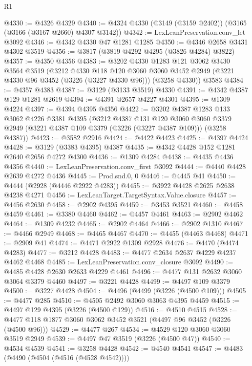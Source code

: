\begin{lexlean}{R1}
\begin{coremodule}
@4330 := @4326 @4329
@4340 := @4324 @4330 (@3149 (@3159 @2402)) (@3165 (@3166 (@3167 @2660) @4307 @3142))
@4342 := LexLeanPreservation.conv_let @3092
@4346 := @4342 @4330 @47 @1281 @1285
@4350 := @4346 @2658 @3431 @4302 @3519
@4356 := @3817 (@3819 @4292 @4295 (@3826 @4284) @3822)
@4357 := @4350 @4356
@4383 := @3202
    @4330
    @1283
    @121
    @3062
    @3430
    @3564
    @3519
    (@3212
      @4330
      @118
      @120
      @3060
      @3060
      @3452
      @2949
      (@3221 @4330 @96 @3452 (@3226 (@3227 @4330 @96)))
      (@3258 @4330))
    @3583
@4384 := @4357 @4383
@4387 := @3129 (@3133 @3519) @4330
@4391 := @4342 @4387 @129 @1281 @2619
@4394 := @4391 @2657 @4227 @4301
@4395 := @1309 @4224
@4397 := @4394 @4395 @4356
@4422 := @3202
    @4387
    @1283
    @133
    @3062
    @4226
    @3381
    @4395
    (@3212
      @4387
      @131
      @120
      @3060
      @3060
      @3379
      @2949
      (@3221 @4387 @109 @3379 (@3226 (@3227 @4387 @109)))
      (@3258 @4387))
@4423 := @3582 @2916
@4424 := @4422 @4423
@4425 := @4397 @4424
@4428 := @3129 (@3383 @4395) @4387
@4435 := @4342 @4428 @152 @1281 @2640 @2656 @4272 @4300
@4436 := @1309 @4284
@4438 := @4435 @4436 @4356
@4440 := LexLeanPreservation.conv_first @3092
@4444 := @4440 @4428 @2639 @4272 @4436
@4445 := Prod.snd.{0, 0}
@4446 := @4445 @41
@4450 := @4444 (@2928 (@4446 @2922 @4283))
@4455 := @3922 @4428 @2625 @2638 @4238 @4271
@4456 := LexLeanTarget.TargetSyntax.Value.closure
@4457 := @4456 @2630
@4458 := @2902 @4395
@4459 := @3453 @3521
@4460 := @4458 @4459
@4461 := @3380 @4460
@4462 := @4457 @4461
@4463 := @2902 @4462
@4464 := @1309 @4232
@4465 := @2902 @4464
@4466 := @2902 @1310
@4467 := @4466 @2949
@4468 := @4465 @4467
@4470 := @4455 (@4463 @4468)
@4471 := @2909 @41
@4474 := @4471 @2922 @1309 @2928
@4476 := @4470 (@4474 @4283)
@4477 := @3212 @4428
@4483 := @4477 @2634 @2637 @4229 @4237 @4462 @4468
@4485 := LexLeanPreservation.conv_closure @3092
@4490 := @4485 @4428 @2630 @2633 @4229 @4461
@4496 := @4477 @131 @2632 @3060 @3064 @3379 @4460
@4497 := @3221 @4428
@4499 := @4497 @109 @3379
@4500 := @3227 @4428
@4504 := @4496 (@4499 (@3226 (@4500 @109)))
@4505 := @4477 @285
@4510 := @4505 @2492 @3060 @3063 @4395 @4459
@4515 := @4497 @129 @4395 (@3226 (@4500 @129))
@4516 := @4510 @4515
@4528 := @4477 @118 @1877 @3060 @3062 @3452 @3521 (@4497 @96 @3452 (@3226 (@4500 @96)))
@4529 := @4477 @267
@4534 := @4529 @120 @3060 @3060 @3519 @2949
@4539 := @4497 @47 @3519 (@3226 (@4500 @47))
@4540 := @4534 @4539
@4541 := @3258 @4428
@4542 := @4540 @4541
@4547 := @4483 (@4490 (@4504 (@4516 (@4528 @4542))))

\end{coremodule}
\end{lexlean}
